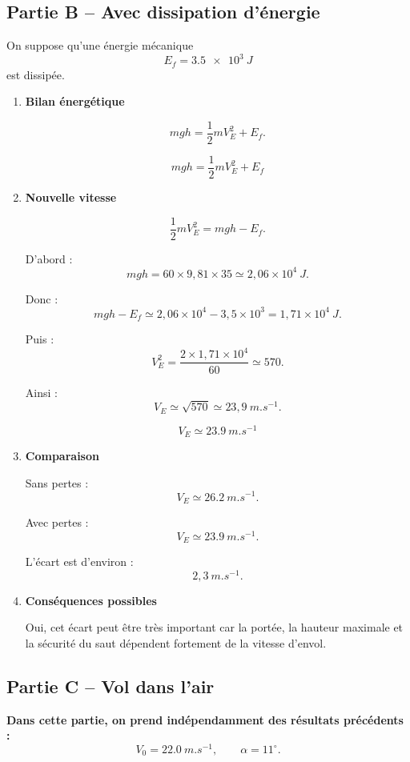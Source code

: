 \documentclass[11pt,a4paper]{article}
\begin{document}
\subsection*{Partie B -- Avec dissipation d’énergie}

On suppose qu’une énergie mécanique
\[
E_f=\SI{3,5e3}{J}
\]
est dissipée.

\begin{enumerate}[label=\textbf{3.\arabic*}, resume, leftmargin=1.6em]

\item \textbf{Bilan énergétique}

\[
mgh=\frac12 mV_E^2+E_f.
\]

\[
\boxed{mgh=\frac12 mV_E^2+E_f}
\]

\item \textbf{Nouvelle vitesse}

\[
\frac12 mV_E^2=mgh-E_f.
\]

D’abord :
\[
mgh=60\times 9{,}81\times 35 \simeq 2{,}06\times 10^4\ \si{J}.
\]

Donc :
\[
mgh-E_f \simeq 2{,}06\times 10^4 - 3{,}5\times 10^3
=1{,}71\times 10^4\ \si{J}.
\]

Puis :
\[
V_E^2=\frac{2\times 1{,}71\times 10^4}{60}\simeq 570.
\]

Ainsi :
\[
V_E\simeq \sqrt{570}\simeq 23{,}9\ \si{m.s^{-1}}.
\]

\[
\boxed{V_E\simeq \SI{23,9}{m.s^{-1}}}
\]

\item \textbf{Comparaison}

Sans pertes :
\[
V_E\simeq \SI{26,2}{m.s^{-1}}.
\]

Avec pertes :
\[
V_E\simeq \SI{23,9}{m.s^{-1}}.
\]

L’écart est d’environ :
\[
2{,}3\ \si{m.s^{-1}}.
\]

\item \textbf{Conséquences possibles}

Oui, cet écart peut être très important car la portée, la hauteur maximale et la sécurité du saut dépendent fortement de la vitesse d’envol.

\end{enumerate}

\subsection*{Partie C -- Vol dans l’air}

\noindent\textbf{Dans cette partie, on prend indépendamment des résultats précédents :}
\[
V_0=\SI{22,0}{m.s^{-1}},
\qquad
\alpha=11^\circ.
\]
\end{document}
